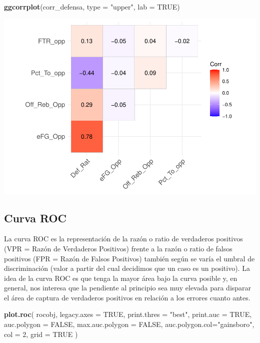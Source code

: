 \documentclass[
]{article}
\newenvironment{Shaded}{\begin{snugshade}}{\end{snugshade}}
\newcommand{\DataTypeTok}[1]{\textcolor[rgb]{0.13,0.29,0.53}{#1}}
\newcommand{\DecValTok}[1]{\textcolor[rgb]{0.00,0.00,0.81}{#1}}
\newcommand{\KeywordTok}[1]{\textcolor[rgb]{0.13,0.29,0.53}{\textbf{#1}}}
\newcommand{\NormalTok}[1]{#1}
\newcommand{\OtherTok}[1]{\textcolor[rgb]{0.56,0.35,0.01}{#1}}
\newcommand{\StringTok}[1]{\textcolor[rgb]{0.31,0.60,0.02}{#1}}
\begin{document}
\begin{Shaded}
\begin{Highlighting}[]
\KeywordTok{ggcorrplot}\NormalTok{(corr_defensa, }\DataTypeTok{type =} \StringTok{"upper"}\NormalTok{, }\DataTypeTok{lab =} \OtherTok{TRUE}\NormalTok{)}
\end{Highlighting}
\end{Shaded}

\includegraphics{practica2_files/figure-latex/unnamed-chunk-93-2.pdf}

\newpage

\hypertarget{curva-roc}{%
\subsection{Curva ROC}\label{curva-roc}}

La curva ROC es la representación de la razón o ratio de verdaderos
positivos (VPR = Razón de Verdaderos Positivos) frente a la razón o
ratio de falsos positivos (FPR = Razón de Falsos Positivos) también
según se varía el umbral de discriminación (valor a partir del cual
decidimos que un caso es un positivo). La idea de la curva ROC es que
tenga la mayor área bajo la curva posible y, en general, nos interesa
que la pendiente al principio sea muy elevada para disparar el área de
captura de verdaderos positivos en relación a los errores cuanto antes.

\begin{Shaded}
\begin{Highlighting}[]
\KeywordTok{plot.roc}\NormalTok{( rocobj, }\DataTypeTok{legacy.axes =} \OtherTok{TRUE}\NormalTok{, }\DataTypeTok{print.thres =} \StringTok{"best"}\NormalTok{, }
          \DataTypeTok{print.auc =} \OtherTok{TRUE}\NormalTok{, }\DataTypeTok{auc.polygon =} \OtherTok{FALSE}\NormalTok{, }\DataTypeTok{max.auc.polygon =} \OtherTok{FALSE}\NormalTok{, }
          \DataTypeTok{auc.polygon.col=}\StringTok{"gainsboro"}\NormalTok{, }\DataTypeTok{col =} \DecValTok{2}\NormalTok{, }\DataTypeTok{grid =} \OtherTok{TRUE}\NormalTok{ )}
\end{Highlighting}
\end{Shaded}
\end{document}
